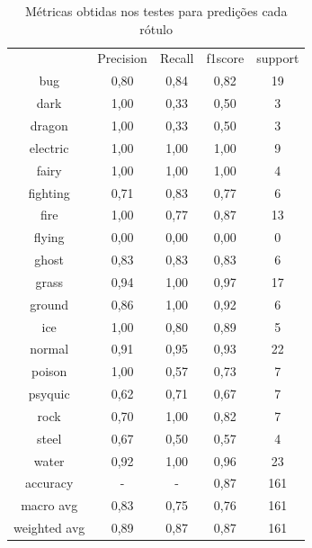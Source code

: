 \documentclass[12pt]{article}
\begin{document}
\begin{table}[H]
    \centering
    \caption{Métricas obtidas nos testes para predições cada rótulo}
    \label{tab:exampleTab1}
    \begin{tabular}{c|c|c|c|c}
                    &   Precision &  Recall   & f1score   & support\\ 
        bug         &      0,80   &   0,84    &  0,82     &   19\\
        dark        &      1,00   &   0,33    &  0,50     &    3\\
        dragon      &      1,00   &   0,33    &  0,50     &    3\\
        electric    &      1,00   &   1,00    &  1,00     &    9\\
        fairy       &      1,00   &   1,00    &  1,00     &    4\\
        fighting    &      0,71   &   0,83    &  0,77     &    6\\
        fire        &      1,00   &   0,77    &  0,87     &   13\\
        flying      &      0,00   &   0,00    &  0,00     &    0\\
        ghost       &      0,83   &   0,83    &  0,83     &    6\\
        grass       &      0,94   &   1,00    &  0,97     &   17\\
        ground      &      0,86   &   1,00    &  0,92     &    6\\
        ice         &      1,00   &   0,80    &  0,89     &    5\\
        normal      &      0,91   &   0,95    &  0,93     &   22\\
        poison      &      1,00   &   0,57    &  0,73     &    7\\
        psyquic     &      0,62   &   0,71    &  0,67     &    7\\
        rock        &      0,70   &   1,00    &  0,82     &    7\\
        steel       &      0,67   &   0,50    &  0,57     &    4\\\vspace{0.5cm}
        water       &      0,92   &   1,00    &  0,96     &   23\\
        accuracy    &        -    &     -     &  0,87     &  161\\
        macro avg   &      0,83   &   0,75    &  0,76     &  161\\
        weighted avg &     0,89   &   0,87    &  0,87     &  161
    \end{tabular}
\end{table}
\end{document}
